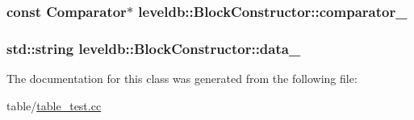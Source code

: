 \subsubsection[{comparator\+\_\+}]{\setlength{\rightskip}{0pt plus 5cm}const {\bf Comparator}$\ast$ leveldb\+::\+Block\+Constructor\+::comparator\+\_\+\hspace{0.3cm}{\ttfamily [private]}}\label{classleveldb_1_1_block_constructor_a8032f2282569a0e187c2b05e4020c348}
\hypertarget{classleveldb_1_1_block_constructor_a16288721d4801a1211ae00295866a142}{}
\subsubsection[{data\+\_\+}]{\setlength{\rightskip}{0pt plus 5cm}std\+::string leveldb\+::\+Block\+Constructor\+::data\+\_\+\hspace{0.3cm}{\ttfamily [private]}}\label{classleveldb_1_1_block_constructor_a16288721d4801a1211ae00295866a142}


The documentation for this class was generated from the following file\+:\begin{DoxyCompactItemize}
\item 
table/\hyperlink{table__test_8cc}{table\+\_\+test.\+cc}\end{DoxyCompactItemize}
